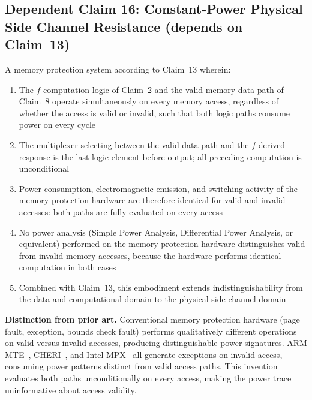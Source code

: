 \documentclass[12pt,letterpaper]{article}
\begin{document}
\subsection*{Dependent Claim 16: Constant-Power Physical Side Channel
  Resistance (depends on Claim~13)}

A memory protection system according to Claim~13 wherein:

\begin{enumerate}[label=(\alph*),noitemsep]
  \item The $f$ computation logic of Claim~2 and the valid memory
        data path of Claim~8 operate simultaneously on every memory
        access, regardless of whether the access is valid or invalid,
        such that both logic paths consume power on every cycle

  \item The multiplexer selecting between the valid data path and
        the $f$-derived response is the last logic element before
        output; all preceding computation is unconditional

  \item Power consumption, electromagnetic emission, and switching
        activity of the memory protection hardware are therefore
        identical for valid and invalid accesses: both paths are
        fully evaluated on every access

  \item No power analysis (Simple Power Analysis, Differential Power
        Analysis, or equivalent) performed on the memory protection
        hardware distinguishes valid from invalid memory accesses,
        because the hardware performs identical computation in
        both cases

  \item Combined with Claim~13, this embodiment extends
        indistinguishability from the data and computational domain
        to the physical side channel domain
\end{enumerate}

\textbf{Distinction from prior art.}
Conventional memory protection hardware (page fault, exception,
bounds check fault) performs qualitatively different operations
on valid versus invalid accesses, producing distinguishable
power signatures.
ARM MTE~\cite{arm_mte}, CHERI~\cite{cheri_isca}, and Intel
MPX~\cite{mpx} all generate exceptions on invalid access,
consuming power patterns distinct from valid access paths.
This invention evaluates both paths unconditionally on every
access, making the power trace uninformative about access validity.
\end{document}
